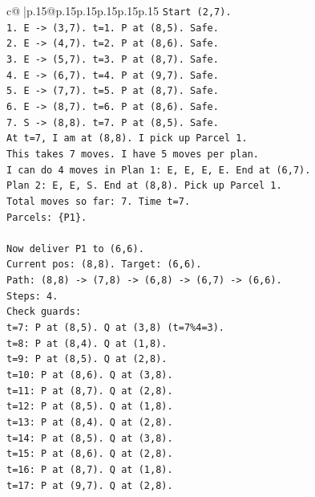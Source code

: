 \documentclass{article}
\begin{document}
{\begin{supertabular}{c@{$\;$}|p{.15\linewidth}@{}p{.15\linewidth}p{.15\linewidth}p{.15\linewidth}p{.15\linewidth}p{.15\linewidth}}
{{{\texttt{Start (2,7).} \\
\texttt{1. E {-}> (3,7). t=1. P at (8,5). Safe.} \\
\texttt{2. E {-}> (4,7). t=2. P at (8,6). Safe.} \\
\texttt{3. E {-}> (5,7). t=3. P at (8,7). Safe.} \\
\texttt{4. E {-}> (6,7). t=4. P at (9,7). Safe.} \\
\texttt{5. E {-}> (7,7). t=5. P at (8,7). Safe.} \\
\texttt{6. E {-}> (8,7). t=6. P at (8,6). Safe.} \\
\texttt{7. S {-}> (8,8). t=7. P at (8,5). Safe.} \\
\texttt{At t=7, I am at (8,8). I pick up Parcel 1.} \\
\texttt{This takes 7 moves. I have 5 moves per plan.} \\
\texttt{I can do 4 moves in Plan 1: E, E, E, E. End at (6,7).} \\
\texttt{Plan 2: E, E, S. End at (8,8). Pick up Parcel 1.} \\
\texttt{Total moves so far: 7. Time t=7.} \\
\texttt{Parcels: \{P1\}.} \\
\\ 
\texttt{Now deliver P1 to (6,6).} \\
\texttt{Current pos: (8,8). Target: (6,6).} \\
\texttt{Path: (8,8) {-}> (7,8) {-}> (6,8) {-}> (6,7) {-}> (6,6).} \\
\texttt{Steps: 4.} \\
\texttt{Check guards:} \\
\texttt{t=7: P at (8,5). Q at (3,8) (t=7\%4=3).} \\
\texttt{t=8: P at (8,4). Q at (1,8).} \\
\texttt{t=9: P at (8,5). Q at (2,8).} \\
\texttt{t=10: P at (8,6). Q at (3,8).} \\
\texttt{t=11: P at (8,7). Q at (2,8).} \\
\texttt{t=12: P at (8,5). Q at (1,8).} \\
\texttt{t=13: P at (8,4). Q at (2,8).} \\
\texttt{t=14: P at (8,5). Q at (3,8).} \\
\texttt{t=15: P at (8,6). Q at (2,8).} \\
\texttt{t=16: P at (8,7). Q at (1,8).} \\
\texttt{t=17: P at (9,7). Q at (2,8).} \\
}}}
\end{supertabular}}
\end{document}
